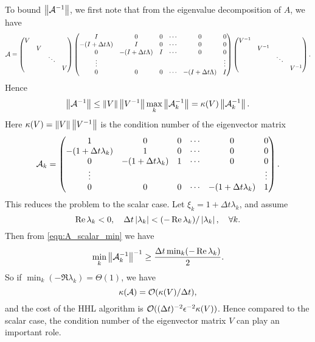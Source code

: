 To bound $\left\lVert\mathcal{A}^{-1}\right\rVert$, we first note that from the eigenvalue decomposition of $A$, we have
\begin{equation}
\mathcal{A}=
\begin{pmatrix}
V \\
& V \\
& & \ddots \\
& & & V
\end{pmatrix}
\begin{pmatrix}
I & 0 & 0 & \cdots & 0 & 0\\
-(I+\Delta t \Lambda) & I & 0 & \cdots & 0 & 0\\
0 & -(I+\Delta t \Lambda) & I & \cdots & 0 & 0\\
\vdots & & & & &\vdots\\
0& 0 & 0 & \cdots & -(I+\Delta t \Lambda) & I
\end{pmatrix}
\begin{pmatrix}
V^{-1} \\
& V^{-1} \\
& & \ddots \\
& & & V^{-1}
\end{pmatrix}.
\end{equation}
Hence
\begin{equation}
\left\lVert\mathcal{A}^{-1}\right\rVert\le \left\lVert V\right\rVert\left\lVert V^{-1}\right\rVert\max_{k} \left\lVert\mathcal{A}_k^{-1}\right\rVert=\kappa(V) \left\lVert\mathcal{A}_k^{-1}\right\rVert.
\end{equation}
Here $\kappa(V)=\left\lVert V\right\rVert\left\lVert V^{-1}\right\rVert$ is the condition number of the eigenvector matrix
\begin{equation}
\mathcal{A}_k=\begin{pmatrix}
1 & 0 & 0 & \cdots & 0 & 0\\
-(1+\Delta t \lambda_k) & 1 & 0 & \cdots & 0 & 0\\
0 & -(1+\Delta t \lambda_k) & 1 & \cdots & 0 & 0\\
\vdots & & & & &\vdots\\
0& 0 & 0 & \cdots & -(1+\Delta t \lambda_k) & 1
\end{pmatrix}.
\end{equation}
This reduces the problem to the scalar case.
Let $\xi_k=1+\Delta t \lambda_k$, and assume
\begin{equation}
\operatorname{Re} \lambda_k <0, \quad \Delta t\left\lvert\lambda_k\right\rvert<(-\operatorname{Re} \lambda_k)/\left\lvert\lambda_k\right\rvert, \quad \forall k.
\end{equation}
Then from \cref{eqn:A_scalar_min} we have
\begin{equation}
 \min_{k}\left\lVert\mathcal{A}^{-1}_k\right\rVert^{-1}\ge \frac{\Delta t \min_{k}(-\operatorname{Re} \lambda_k)}{2}.
 \end{equation}
So if $\min_{k}(-\Re \lambda_k)=\Theta(1)$, we have 
\begin{equation}
\kappa(\mathcal{A})=\mathcal{O}(\kappa(V)/\Delta t),
\end{equation}
and the cost of the HHL algorithm is $\mathcal{O}((\Delta t)^{-2}\epsilon^{-2}\kappa(V))$.
Hence compared to the scalar case, the condition number of the eigenvector matrix $V$ can play an important role. 

